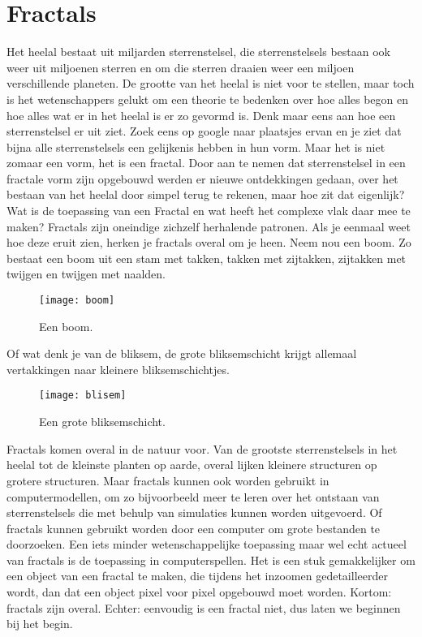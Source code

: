 \documentclass[11pt,fleqn]{book} %
\begin{document}
\chapter{Fractals}
Het heelal bestaat uit miljarden sterrenstelsel, die sterrenstelsels bestaan ook weer uit miljoenen sterren en om die sterren draaien weer een miljoen verschillende planeten. De grootte van het heelal is niet voor te stellen, maar toch is het wetenschappers gelukt om een theorie te bedenken over hoe alles begon en hoe alles wat er in het heelal is er zo gevormd is. Denk maar eens aan hoe een sterrenstelsel er uit ziet. Zoek eens op google naar plaatsjes ervan en je ziet dat bijna alle sterrenstelsels een gelijkenis hebben in hun vorm. Maar het is niet zomaar een vorm, het is een fractal. Door aan te nemen dat sterrenstelsel in een fractale vorm zijn opgebouwd werden er nieuwe ontdekkingen gedaan, over het bestaan van het heelal door simpel terug te rekenen, maar hoe zit dat eigenlijk? Wat is de toepassing van een Fractal en wat heeft het complexe vlak daar mee te maken? 
Fractals zijn oneindige zichzelf herhalende patronen. Als je eenmaal weet hoe deze eruit zien, herken je fractals overal om je heen. 
Neem nou een boom. Zo bestaat een boom uit een stam met takken, takken met zijtakken, zijtakken met twijgen en twijgen met naalden.
\begin{figure}[h]
	\centering\texttt{[image: boom]}
	\caption{Een boom.}
	\label{fig:boom}
\end{figure}
Of wat denk je van de bliksem, de grote bliksemschicht krijgt allemaal vertakkingen naar kleinere bliksemschichtjes.
\begin{figure}[h]
	\centering\texttt{[image: blisem]}
	\caption{Een grote bliksemschicht.}
	\label{fig:blisem}
\end{figure}
Fractals komen overal in de natuur voor. Van de grootste sterrenstelsels in het heelal tot de kleinste planten op aarde, overal lijken kleinere structuren op grotere structuren. Maar fractals kunnen ook worden gebruikt in computermodellen, om zo bijvoorbeeld meer te leren over het ontstaan van sterrenstelsels die met behulp van simulaties kunnen worden uitgevoerd. Of fractals kunnen gebruikt worden door een computer om grote bestanden te doorzoeken. Een iets minder wetenschappelijke toepassing maar wel echt actueel van fractals is de toepassing in computerspellen. Het is een stuk gemakkelijker om een object van een fractal te maken, die tijdens het inzoomen gedetailleerder wordt, dan dat een object pixel voor pixel opgebouwd moet worden. Kortom: fractals zijn overal. Echter: eenvoudig is een fractal niet, dus laten we beginnen bij het begin.
\end{document}

